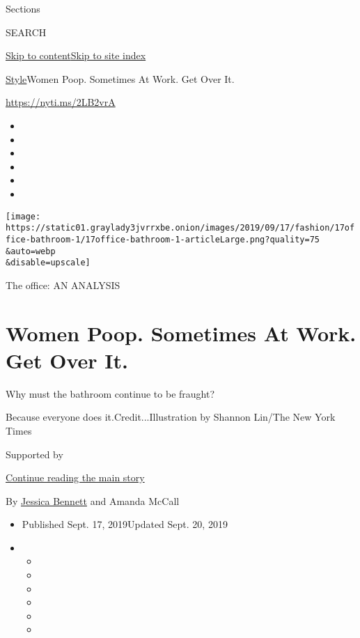 Sections

SEARCH

\protect\hyperlink{site-content}{Skip to
content}\protect\hyperlink{site-index}{Skip to site index}

\href{/section/style}{Style}\textbar{}Women Poop. Sometimes At Work. Get
Over It.

\url{https://nyti.ms/2LB2vrA}

\begin{itemize}
\item
\item
\item
\item
\item
\item
\end{itemize}

\texttt{[image: https://static01.graylady3jvrrxbe.onion/images/2019/09/17/fashion/17office-bathroom-1/17office-bathroom-1-articleLarge.png?quality=75\\\&auto=webp\\\&disable=upscale]}

The office: AN ANALYSIS

\hypertarget{women-poop-sometimes-at-work-get-over-it}{%
\section{Women Poop. Sometimes At Work. Get Over
It.}\label{women-poop-sometimes-at-work-get-over-it}}

Why must the bathroom continue to be fraught?

Because everyone does it.Credit...Illustration by Shannon Lin/The New
York Times

Supported by

\protect\hyperlink{after-sponsor}{Continue reading the main story}

By \href{https://www.nytimes3xbfgragh.onion/by/jessica-bennett}{Jessica
Bennett} and Amanda McCall

\begin{itemize}
\item
  Published Sept. 17, 2019Updated Sept. 20, 2019
\item
  \begin{itemize}
  \item
  \item
  \item
  \item
  \item
  \item
  \end{itemize}
\end{itemize}


